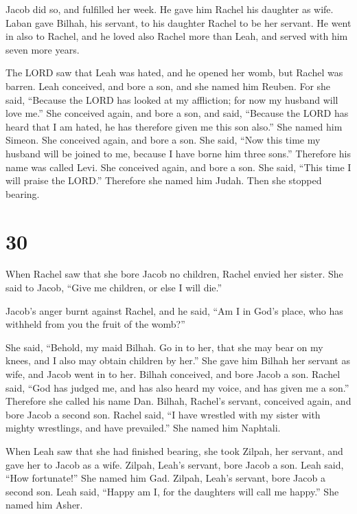 Jacob did so, and fulfilled her week. He gave him Rachel
his daughter as wife.  Laban gave Bilhah, his servant, to
his daughter Rachel to be her servant.  He went in also to
Rachel, and he loved also Rachel more than Leah, and served with him
seven more years.

 The LORD saw that Leah was hated, and he opened her womb,
but Rachel was barren.  Leah conceived, and bore a son, and
she named him Reuben. For she said, ``Because the LORD has looked at my
affliction; for now my husband will love me.''  She
conceived again, and bore a son, and said, ``Because the LORD has heard
that I am hated, he has therefore given me this son also.'' She named
him Simeon.  She conceived again, and bore a son. She said,
``Now this time my husband will be joined to me, because I have borne
him three sons.'' Therefore his name was called Levi.  She
conceived again, and bore a son. She said, ``This time I will praise the
LORD.'' Therefore she named him Judah. Then she stopped bearing.

\hypertarget{section-29}{%
\section{30}\label{section-29}}

 When Rachel saw that she bore Jacob no children, Rachel
envied her sister. She said to Jacob, ``Give me children, or else I will
die.''

 Jacob's anger burnt against Rachel, and he said, ``Am I in
God's place, who has withheld from you the fruit of the womb?''

 She said, ``Behold, my maid Bilhah. Go in to her, that she
may bear on my knees, and I also may obtain children by her.''
 She gave him Bilhah her servant as wife, and Jacob went in
to her.  Bilhah conceived, and bore Jacob a son.
 Rachel said, ``God has judged me, and has also heard my
voice, and has given me a son.'' Therefore she called his name Dan.
 Bilhah, Rachel's servant, conceived again, and bore Jacob a
second son.  Rachel said, ``I have wrestled with my sister
with mighty wrestlings, and have prevailed.'' She named him Naphtali.

 When Leah saw that she had finished bearing, she took
Zilpah, her servant, and gave her to Jacob as a wife. 
Zilpah, Leah's servant, bore Jacob a son.  Leah said, ``How
fortunate!'' She named him Gad.  Zilpah, Leah's servant,
bore Jacob a second son.  Leah said, ``Happy am I, for the
daughters will call me happy.'' She named him Asher.

